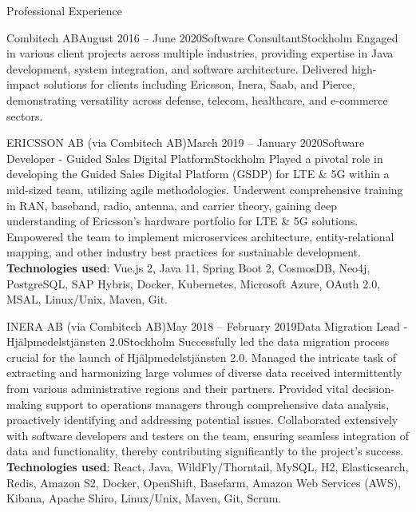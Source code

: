 \documentclass{resume}
\begin{document}
\begin{rSection}{Professional Experience}
\begin{rSubsection}{Combitech AB}{August 2016 -- June 2020}{Software Consultant}{Stockholm}
\bItem Engaged in various client projects across multiple industries, providing expertise in Java development, system integration, and software architecture.
\bItem Delivered high-impact solutions for clients including Ericsson, Inera, Saab, and Pierce, demonstrating versatility across defense, telecom, healthcare, and e-commerce sectors.
\end{rSubsection}

\begin{rClientSubsection}{ERICSSON AB (via Combitech AB)}{March 2019 -- January 2020}{Software Developer - Guided Sales Digital Platform}{Stockholm}
\bItem Played a pivotal role in developing the Guided Sales Digital Platform (GSDP) for LTE \& 5G within a mid-sized team, utilizing agile methodologies.
\bItem Underwent comprehensive training in RAN, baseband, radio, antenna, and carrier theory, gaining deep understanding of Ericsson's hardware portfolio for LTE \& 5G solutions.
\bItem Empowered the team to implement microservices architecture, entity-relational mapping, and other industry best practices for sustainable development.
\bItem \textbf{Technologies used}: Vue.js 2, Java 11, Spring Boot 2, CosmosDB, Neo4j, PostgreSQL, SAP Hybris, Docker, Kubernetes, Microsoft Azure, OAuth 2.0, MSAL, Linux/Unix, Maven, Git.
\end{rClientSubsection}

\begin{rClientSubsection}{INERA AB (via Combitech AB)}{May 2018 -- February 2019}{Data Migration Lead - Hjälpmedelstjänsten 2.0}{Stockholm}
\bItem Successfully led the data migration process crucial for the launch of Hjälpmedelstjänsten 2.0.
\bItem Managed the intricate task of extracting and harmonizing large volumes of diverse data received intermittently from various administrative regions and their partners.
\bItem Provided vital decision-making support to operations managers through comprehensive data analysis, proactively identifying and addressing potential issues.
\bItem Collaborated extensively with software developers and testers on the team, ensuring seamless integration of data and functionality, thereby contributing significantly to the project's success.
\bItem \textbf{Technologies used}: React, Java, WildFly/Thorntail, MySQL, H2, Elasticsearch, Redis, Amazon S2, Docker, OpenShift, Basefarm, Amazon Web Services (AWS), Kibana, Apache Shiro, Linux/Unix, Maven, Git, Scrum.
\end{rClientSubsection}


\end{rSection}
\end{document}
